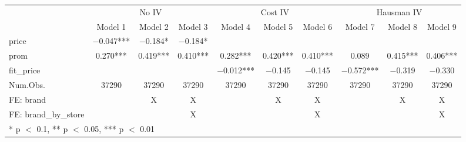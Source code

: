 \begin{table}
\centering
\begin{tabular}[t]{lccccccccc}
\toprule
\multicolumn{1}{c}{ } & \multicolumn{3}{c}{No IV} & \multicolumn{3}{c}{Cost IV} & \multicolumn{3}{c}{Hausman IV} \\
\cmidrule(l{3pt}r{3pt}){2-4} \cmidrule(l{3pt}r{3pt}){5-7} \cmidrule(l{3pt}r{3pt}){8-10}
  & Model 1 & Model 2 & Model 3 & Model 4 & Model 5 & Model 6 & Model 7 & Model 8 & Model 9\\
\midrule
price & \num{-0.047}*** & \num{-0.184}* & \num{-0.184}* &  &  &  &  &  & \\
prom & \num{0.270}*** & \num{0.419}*** & \num{0.410}*** & \num{0.282}*** & \num{0.420}*** & \num{0.410}*** & \num{0.089} & \num{0.415}*** & \num{0.406}***\\
fit\_price &  &  &  & \num{-0.012}*** & \num{-0.145} & \num{-0.145} & \num{-0.572}*** & \num{-0.319} & \num{-0.330}\\
\midrule
Num.Obs. & \num{37290} & \num{37290} & \num{37290} & \num{37290} & \num{37290} & \num{37290} & \num{37290} & \num{37290} & \num{37290}\\
FE: brand &  & X & X &  & X & X &  & X & X\\
FE: brand_by_store &  &  & X &  &  & X &  &  & X\\
\bottomrule
\multicolumn{10}{l}{\rule{0pt}{1em}* p $<$ 0.1, ** p $<$ 0.05, *** p $<$ 0.01}\\
\end{tabular}
\end{table}
